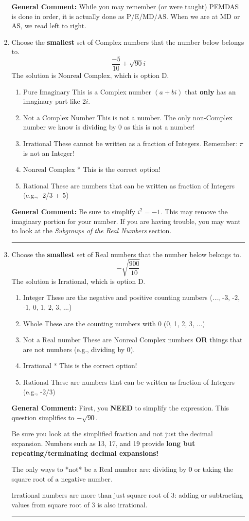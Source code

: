\documentclass{extbook}[14pt]
\newcommand{\litem}[1]{\item #1

\rule{\textwidth}{0.4pt}}
\begin{document}
\begin{enumerate}
{\textbf{General Comment:} While you may remember (or were taught) PEMDAS is done in order, it is actually done as P/E/MD/AS. When we are at MD or AS, we read left to right.
}
\litem{
Choose the \textbf{smallest} set of Complex numbers that the number below belongs to.
\[ \frac{-5}{10}+\sqrt{90} i \]
The solution is \( \text{Nonreal Complex} \), which is option D.\begin{enumerate}[label=\Alph*.]
\item \( \text{Pure Imaginary} \)
This is a Complex number $(a+bi)$ that \textbf{only} has an imaginary part like $2i$.
\item \( \text{Not a Complex Number} \)
This is not a number. The only non-Complex number we know is dividing by 0 as this is not a number!
\item \( \text{Irrational} \)
These cannot be written as a fraction of Integers. Remember: $\pi$ is not an Integer!
\item \( \text{Nonreal Complex} \)
* This is the correct option!
\item \( \text{Rational} \)
These are numbers that can be written as fraction of Integers (e.g., -2/3 + 5)
\end{enumerate}

\textbf{General Comment:} Be sure to simplify $i^2 = -1$. This may remove the imaginary portion for your number. If you are having trouble, you may want to look at the \textit{Subgroups of the Real Numbers} section.
}
\litem{
Choose the \textbf{smallest} set of Real numbers that the number below belongs to.
\[ -\sqrt{\frac{900}{10}} \]
The solution is \( \text{Irrational} \), which is option D.\begin{enumerate}[label=\Alph*.]
\item \( \text{Integer} \)
These are the negative and positive counting numbers (..., -3, -2, -1, 0, 1, 2, 3, ...)
\item \( \text{Whole} \)
These are the counting numbers with 0 (0, 1, 2, 3, ...)
\item \( \text{Not a Real number} \)
These are Nonreal Complex numbers \textbf{OR} things that are not numbers (e.g., dividing by 0).
\item \( \text{Irrational} \)
* This is the correct option!
\item \( \text{Rational} \)
These are numbers that can be written as fraction of Integers (e.g., -2/3)
\end{enumerate}

\textbf{General Comment:} First, you \textbf{NEED} to simplify the expression. This question simplifies to $-\sqrt{90}$. 
 
 Be sure you look at the simplified fraction and not just the decimal expansion. Numbers such as 13, 17, and 19 provide \textbf{long but repeating/terminating decimal expansions!} 
 
 The only ways to *not* be a Real number are: dividing by 0 or taking the square root of a negative number. 
 
 Irrational numbers are more than just square root of 3: adding or subtracting values from square root of 3 is also irrational.
}
\end{enumerate}
\end{document}
